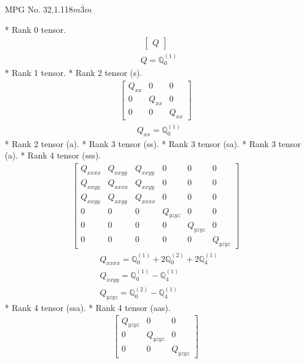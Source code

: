 \documentclass[fleqn,8pt,landscape]{jsarticle}
\begin{document}
\setcounter{MaxMatrixCols}{32}

\renewcommand{\tablename}{Table~}
\renewcommand{\figurename}{Figure~}
\begin{center}
\LARGE
MPG No. 32.1.118\quad$m\bar{3}m$
\end{center}
* Rank 0 tensor.
\begin{align*}
\begin{bmatrix} Q \end{bmatrix}
\end{align*}
\begin{align*}
& Q = \mathbb{Q}_{0}^{(1)}
\end{align*}
* Rank 1 tensor.
* Rank 2 tensor (s).
\begin{align*}
\begin{bmatrix} Q_{xx} & 0 & 0 \\ 0 & Q_{xx} & 0 \\ 0 & 0 & Q_{xx} \end{bmatrix}
\end{align*}
\begin{align*}
& Q_{xx} = \mathbb{Q}_{0}^{(1)}
\end{align*}
* Rank 2 tensor (a).
* Rank 3 tensor (ss).
* Rank 3 tensor (sa).
* Rank 3 tensor (a).
* Rank 4 tensor (sss).
\begin{align*}
\begin{bmatrix} Q_{xxxx} & Q_{xxyy} & Q_{xxyy} & 0 & 0 & 0 \\ Q_{xxyy} & Q_{xxxx} & Q_{xxyy} & 0 & 0 & 0 \\ Q_{xxyy} & Q_{xxyy} & Q_{xxxx} & 0 & 0 & 0 \\ 0 & 0 & 0 & Q_{yzyz} & 0 & 0 \\ 0 & 0 & 0 & 0 & Q_{yzyz} & 0 \\ 0 & 0 & 0 & 0 & 0 & Q_{yzyz} \end{bmatrix}
\end{align*}
\begin{align*}
& Q_{xxxx} = \mathbb{Q}_{0}^{(1)} + 2 \mathbb{Q}_{0}^{(2)} + 2 \mathbb{Q}_{4}^{(1)} \\
& Q_{xxyy} = \mathbb{Q}_{0}^{(1)} - \mathbb{Q}_{4}^{(1)} \\
& Q_{yzyz} = \mathbb{Q}_{0}^{(2)} - \mathbb{Q}_{4}^{(1)}
\end{align*}
* Rank 4 tensor (ssa).
* Rank 4 tensor (aas).
\begin{align*}
\begin{bmatrix} Q_{yzyz} & 0 & 0 \\ 0 & Q_{yzyz} & 0 \\ 0 & 0 & Q_{yzyz} \end{bmatrix}
\end{align*}
\end{document}
